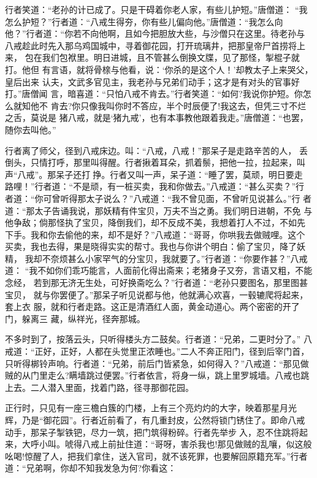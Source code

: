 行者笑道：“老孙的计已成了。只是干碍着你老人家，有些儿护短。”唐僧道：
“我怎么护短？”行者道：“八戒生得夯，你有些儿偏向他。”唐僧道：“我怎么向
他？”行者道：“你若不向他啊，且如今把胆放大些，与沙僧只在这里。待老孙与
八戒趁此时先入那乌鸡国城中，寻着御花园，打开琉璃井，把那皇帝尸首捞将上来，
包在我们包袱里。明日进城，且不管甚么倒换文牒，见了那怪，掣棍子就打。他但
有言语，就将骨榇与他看，说：‘你杀的是这个人！’却教太子上来哭父，皇后出来
认夫，文武多官见主，我老孙与兄弟们动手；这才是有对头的官事好打。”唐僧闻
言，暗喜道：“只怕八戒不肯去。”行者笑道：“如何?我说你护短。你怎么就知他不
肯去?你只像我叫你时不答应，半个时辰便了!我这去，但凭三寸不烂之舌，莫说是
猪八戒，就是‘猪九戒’，也有本事教他跟着我走。”唐僧道：“也罢，随你去叫他。”

行者离了师父，径到八戒床边。叫：“八戒，八戒！”那呆子是走路辛苦的人，
丢倒头，只情打呼，那里叫得醒。行者揪着耳朵，抓着鬃，把他一拉，拉起来，叫
声“八戒”。那呆子还打挣。行者又叫一声，呆子道：“睡了罢，莫顽，明日要走
路哩！”行者道：“不是顽，有一桩买卖，我和你做去。”八戒道：“甚么买卖？”行
者道：“你可曾听得那太子说么？”八戒道：“我不曾见面，不曾听见说甚么。”行
者道：“那太子告诵我说，那妖精有件宝贝，万夫不当之勇。我们明日进朝，不免
与他争敌；倘那怪执了宝贝，降倒我们，却不反成不美，我想着打人不过，不如先
下手。我和你去偷他的来，却不是好？”八戒道：“哥哥，你哄我去做贼哩。这个
买卖，我也去得，果是晓得实实的帮寸。我也与你讲个明白：偷了宝贝，降了妖精，
我却不奈烦甚么小家罕气的分宝贝，我就要了。”行者道：“你要作甚？”八戒道：
“我不如你们乖巧能言，人面前化得出斋来；老猪身子又夯，言语又粗，不能念经，
若到那无济无生处，可好换斋吃么？”行者道：“老孙只要图名，那里图甚宝贝，
就与你罢便了。”那呆子听见说都与他，他就满心欢喜，一毂辘爬将起来，套上衣
服，就和行者走路。这正是清酒红人面，黄金动道心。两个密密的开了门，躲离三
藏，纵祥光，径奔那城。

不多时到了，按落云头，只听得楼头方二鼓矣。行者道：“兄弟，二更时分了。”
八戒道：“正好，正好，人都在头觉里正浓睡也。”二人不奔正阳门，径到后宰门首，
只听得梆铃声响。行者道：“兄弟，前后门皆紧急，如何得入？”八戒道：“那见做
贼的从门里走么?瞒墙跳过便罢。”行者依言，将身一纵，跳上里罗城墙。八戒也跳
上去。二人潜入里面，找着门路，径寻那御花园。

正行时，只见有一座三檐白簇的门楼，上有三个亮灼灼的大字，映着那星月光
辉，乃是“御花园”。行者近前看了，有几重封皮，公然将锁门锈住了。即命八戒
动手，那呆子掣铁钯，尽力一筑，把门筑得粉碎。行者先举步入，忍不住跳将起
来，大呼小叫。唬得八戒上前扯住道：“哥呀，害杀我也!那见做贼的乱嚷，似这般
吆喝!惊醒了人，把我们拿住，送入官司，就不该死罪，也要解回原籍充军。”行者
道：“兄弟啊，你却不知我发急为何?你看这：

